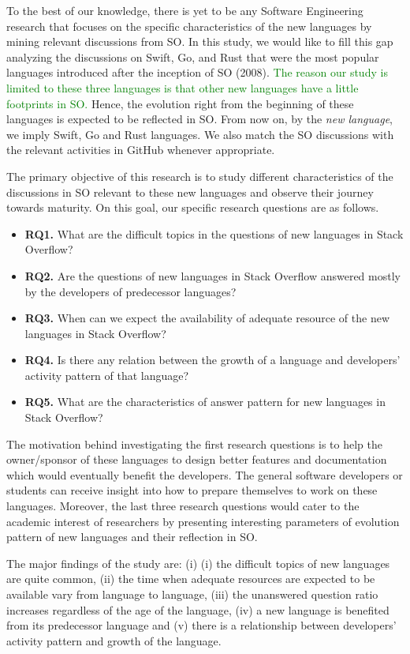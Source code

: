 To the best of our knowledge, there is yet to be any Software Engineering research that focuses on the specific characteristics of the new languages by mining relevant discussions from SO. In this study, we would like to fill this gap analyzing the discussions on Swift, Go, and Rust that were the most popular languages introduced after the inception of SO (2008). \textcolor{green}{The reason our study is limited to these three languages is that other new languages have a little footprints in SO.} Hence, the evolution right from the beginning of these languages is expected to be reflected in SO. From now on, by the \emph{new language},  we imply Swift, Go and Rust languages. We also match the SO discussions with the relevant activities in GitHub whenever appropriate. 

The primary objective of this research is to study different characteristics of the discussions in SO relevant to these new languages and observe their journey towards maturity. On this goal, our specific research questions are as follows.
\begin{itemize}
\item \textbf{RQ1.} What are the difficult topics in the questions of new languages in Stack Overflow?
\item \textbf{RQ2.} Are the questions of new languages in Stack Overflow answered mostly by the developers of predecessor languages?
\item \textbf{RQ3.} When can we expect the availability of adequate resource of the new languages in Stack Overflow?
\item \textbf{RQ4.} Is there any relation between the growth of a language and developers' activity pattern of that language?
\item \textbf{RQ5.} What are the characteristics of answer pattern for new languages in Stack Overflow?
\end{itemize}

The motivation behind investigating the first research questions is to help the owner/sponsor of these languages to design better features and documentation which would eventually benefit the developers. The general software developers or students can receive insight into how to prepare themselves to work on these languages. Moreover, the last three research questions would cater to the academic interest of researchers by presenting interesting parameters of evolution pattern of new languages and their reflection in SO.


The major findings of the study are: (i) (i) the difficult topics of new languages are quite common, (ii) the time when adequate resources are expected to be available vary from language to language, (iii) the unanswered question ratio increases regardless of the age of the language, (iv) a new language is benefited from its predecessor language and (v) there is a relationship between developers' activity pattern and growth of the language.

